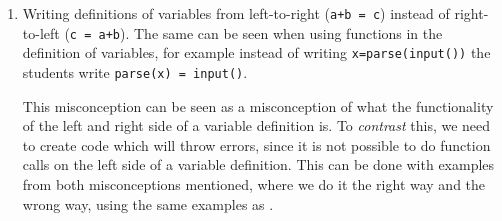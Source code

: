 \begin{enumerate}
      The \emph{generalisation} for this pattern is easy, and consists of 
several variable-definitions where other variables are used in the 
definition. Here again we are also including different function 
functionalities, to help students understand variables and functions 
simultaneously. 

      \hfill
     \begin{minipage}[t]{0.45\columnwidth}
        \begin{verbatim}
            def example(y):
                x = y

    
                return x   
        \end{verbatim}
    \end{minipage}
\hfill
    \begin{minipage}[t]{0.45\columnwidth}
        \begin{verbatim}
            def example():
                a = 3
                b = a
    
                return b
        \end{verbatim}
    \end{minipage}
\hfill
     
      
      The last pattern, \emph{Fusion}, should consist of both
variable-definitions and a place where the variables are then used in a
comparison-statement, so that the student must tell assignment
(\texttt{=}) from comparison (\texttt{==}) within a
single program.

      \hfill
      \begin{minipage}[t]{0.45\columnwidth}
        \begin{verbatim}
            def example():
                a = 3
                b = a + 1
                return a == b
        \end{verbatim}
      \end{minipage}
    \item Writing definitions of variables from left-to-right 
      (\texttt{a+b = c}) instead of right-to-left 
      (\texttt{c = a+b}). The same can be seen when using 
functions 
      in the definition of variables, for example instead of writing 
      \texttt{x=parse(input())} the students write 
      \texttt{parse(x) = input()}.

      This misconception can be seen as a misconception of what the 
functionality of the left and right side of a variable definition 
is. To \emph{contrast} this, we need to create code which will throw 
errors, since it is not possible to do function calls on the left 
side of a variable definition. This can be done with examples from 
both misconceptions mentioned, where we do it the right way and the 
wrong way, using the same examples as \textcite{GuoMarkelZhang2020}.


\end{enumerate}
